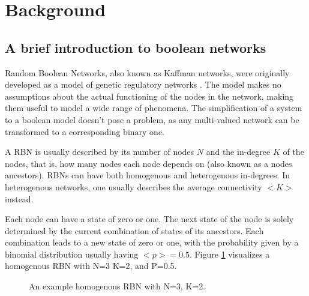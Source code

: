 \section{Background}

\subsection{A brief introduction to boolean networks}

Random Boolean Networks, also known as Kaffman networks, were originally developed as a model of genetic regulatory networks \cite{kauffman1969metabolic}.
The model makes no assumptions about the actual functioning of the nodes in the network,
making them useful to model a wide range of phenomena.
The simplification of a system to a boolean model doesn't pose a problem,
as any multi-valued network can be transformed to a corresponding binary one.

A RBN is usually described by its number of nodes $N$ and the in-degree $K$ of the nodes,
that is, how many nodes each node depends on (also known as a nodes ancestors).
RBNs can have both homogenous and heterogenous in-degrees.
In heterogenous networks, one usually describes the average connectivity $<K>$ instead.

Each node can have a state of zero or one.
The next state of the node is solely determined by the current combination of states of its ancestors.
Each combination leads to a new state of zero or one,
with the probability given by a binomial distribution usually having $<p>=0.5$.
Figure \ref{figure:sample-homogenous-rbn} visualizes a homogenous RBN with N=3 K=2, and P=0.5.

\begin{figure}
  \centering
  \caption{An example homogenous RBN with N=3, K=2.}
  \label{figure:sample-homogenous-rbn}
\end{figure}

